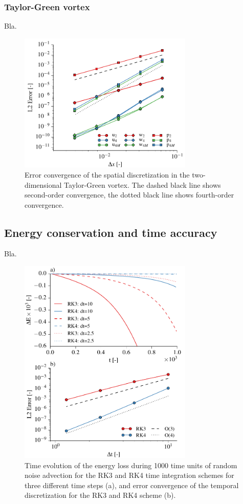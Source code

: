 \documentclass[gmd]{copernicus}
\begin{document}
\subsubsection{Taylor-Green vortex}
Bla.
\begin{figure}[t]
\vspace*{2mm}
\begin{center}
\includegraphics[width=8.3cm]{figs/taylorgreen.pdf}
\end{center}
\caption{Error convergence of the spatial discretization in the two-dimensional Taylor-Green vortex. The dashed black line shows second-order convergence, the dotted black line shows fourth-order convergence.}
\end{figure}

\subsection{Energy conservation and time accuracy}\label{sec:validationtime}
Bla.
\begin{figure}[t]
\vspace*{2mm}
\begin{center}
\includegraphics[width=8.3cm]{figs/timeconvergence.pdf}
\end{center}
\caption{Time evolution of the energy loss during 1000 time units of random noise advection for the RK3 and RK4 time integration schemes for three different time steps (a), and error convergence of the temporal discretization for the RK3 and RK4 scheme (b).}
\end{figure}
\end{document}
